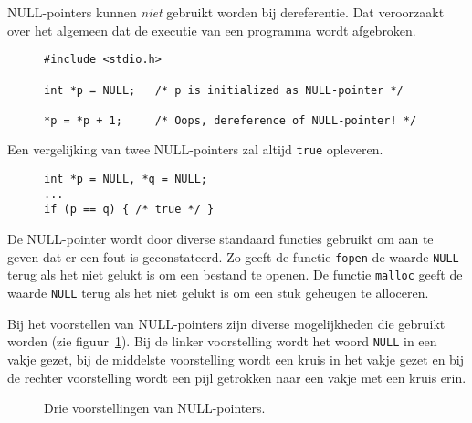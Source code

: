 NULL-pointers kunnen \textsl{niet} gebruikt worden bij dereferentie. Dat veroorzaakt over het algemeen dat de executie van een programma wordt afgebroken.

\begin{figure}[!ht]
\begin{lstlisting}[caption=Dereferentie van een NULL-pointer.]
#include <stdio.h>

int *p = NULL;   /* p is initialized as NULL-pointer */

*p = *p + 1;     /* Oops, dereference of NULL-pointer! */
\end{lstlisting}
\end{figure}

Een vergelijking van twee NULL-pointers zal altijd \texttt{true} opleveren.

\begin{figure}[H]
\begin{lstlisting}[caption=Vergelijken van twee NULL-pointers.]
int *p = NULL, *q = NULL;
...
if (p == q) { /* true */ }
\end{lstlisting}
\end{figure}

De NULL-pointer wordt door diverse standaard functies gebruikt om aan te geven dat er een fout is geconstateerd. Zo geeft de functie \texttt{fopen} de waarde \texttt{NULL} terug als het niet gelukt is om een bestand te openen. De functie \texttt{malloc} geeft de waarde \texttt{NULL} terug als het niet gelukt is om een stuk geheugen te alloceren.

Bij het voorstellen van NULL-pointers zijn diverse mogelijkheden die gebruikt worden (zie figuur~\ref{fig:poinullpointers}). Bij de linker voorstelling wordt het woord \texttt{NULL} in een vakje gezet, bij de middelste voorstelling wordt een kruis in het vakje gezet en bij de rechter voorstelling wordt een pijl getrokken naar een vakje met een kruis erin.

\begin{figure}[!ht]
\centering
{}
\caption{Drie voorstellingen van NULL-pointers.}
\label{fig:poinullpointers}
\end{figure}


